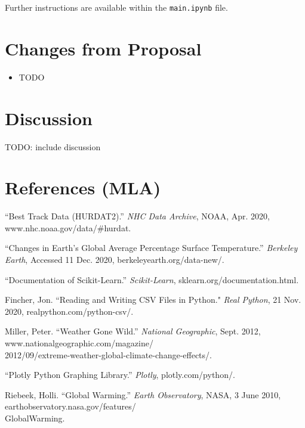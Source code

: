 \documentclass[fontsize=11pt]{article}
\begin{document}
Further instructions are available within the \texttt{main.ipynb} file.

\section*{Changes from Proposal}
\begin{itemize}
    \item TODO
\end{itemize}

\section*{Discussion}

TODO: include discussion

\section*{References (MLA)}

\begin{hangparas}{0.5in}{1}

“Best Track Data (HURDAT2).” \textit{NHC Data Archive}, NOAA, Apr. 2020, www.nhc.noaa.gov/data/\#hurdat.

\bigskip

“Changes in Earth's Global Average Percentage Surface Temperature.” \textit{Berkeley Earth}, Accessed 11 Dec. 2020, berkeleyearth.org/data-new/.

\bigskip

“Documentation of Scikit-Learn.” \textit{Scikit-Learn}, sklearn.org/documentation.html.

\bigskip

Fincher, Jon. ``Reading and Writing CSV Files in Python." \textit{Real Python}, 21 Nov. 2020, realpython.com/python-csv/.

\bigskip

Miller, Peter. “Weather Gone Wild.” \textit{National Geographic}, Sept. 2012, www.nationalgeographic.com/magazine/\\2012/09/extreme-weather-global-climate-change-effects/.

\bigskip

“Plotly Python Graphing Library.” \textit{Plotly}, plotly.com/python/.

\bigskip

Riebeek, Holli. “Global Warming.” \textit{Earth Observatory}, NASA, 3 June 2010, earthobservatory.nasa.gov/features/\\GlobalWarming.



\end{hangparas}
\end{document}
